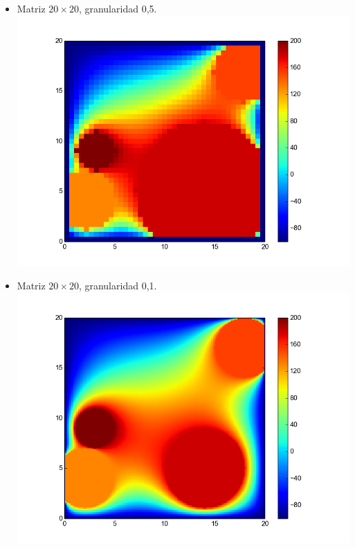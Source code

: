 \begin{itemize}
 \item Matriz $20 \times 20$, granularidad 0,5.\\
  \includegraphics[width=400pt]{imagenes/imagen31.png}
  
   \item Matriz $20 \times 20$, granularidad 0,1.\\
  \includegraphics[width=400pt]{imagenes/imagen41.png}
\end{itemize}

